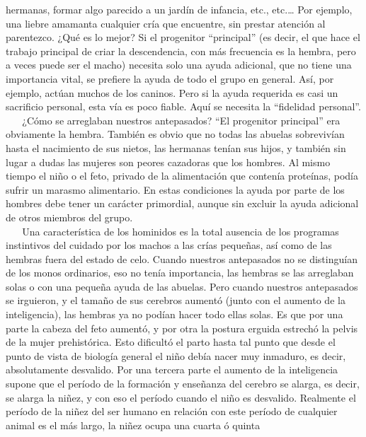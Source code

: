 hermanas, formar algo parecido a un jardín de infancia, etc.,
etc.\ldots{} Por ejemplo, una liebre amamanta cualquier cría que
encuentre, sin prestar atención al parentezco. ¿Qué es lo mejor? Si el
progenitor ``principal'' (es decir, el que hace el trabajo principal de
criar la descendencia, con más frecuencia es la hembra, pero a veces
puede ser el macho) necesita solo una ayuda adicional, que no tiene una
importancia vital, se prefiere la ayuda de todo el grupo en general.
Así, por ejemplo, actúan muchos de los caninos. Pero si la ayuda
requerida es casi un sacrificio personal, esta vía es poco fiable. Aquí
se necesita la ``fidelidad personal''.\\
\hspace*{0.333em} ~ ~ ¿Cómo se arreglaban nuestros antepasados? ``El
progenitor principal'' era obviamente la hembra. También es obvio que no
todas las abuelas sobrevivían hasta el nacimiento de sus nietos, las
hermanas tenían sus hijos, y también sin lugar a dudas las mujeres son
peores cazadoras que los hombres. Al mismo tiempo el niño o el feto,
privado de la alimentación que contenía proteínas, podía sufrir un
marasmo alimentario. En estas condiciones la ayuda por parte de los
hombres debe tener un carácter primordial, aunque sin excluir la ayuda
adicional de otros miembros del grupo.\\
\hspace*{0.333em} ~ ~ Una característica de los hominidos es la total
ausencia de los programas instintivos del cuidado por los machos a las
crías pequeñas, así como de las hembras fuera del estado de celo. Cuando
nuestros antepasados no se distinguían de los monos ordinarios, eso no
tenía importancia, las hembras se las arreglaban solas o con una pequeña
ayuda de las abuelas. Pero cuando nuestros antepasados se irguieron, y
el tamaño de sus cerebros aumentó (junto con el aumento de la
inteligencia), las hembras ya no podían hacer todo ellas solas. Es que
por una parte la cabeza del feto aumentó, y por otra la postura erguida
estrechó la pelvis de la mujer prehistórica. Esto dificultó el parto
hasta tal punto que desde el punto de vista de biología general el niño
debía nacer muy inmaduro, es decir, absolutamente desvalido. Por una
tercera parte el aumento de la inteligencia supone que el período de la
formación y enseñanza del cerebro se alarga, es decir, se alarga la
niñez, y con eso el período cuando el niño es desvalido. Realmente el
período de la niñez del ser humano en relación con este período de
cualquier animal es el más largo, la niñez ocupa una cuarta ó quinta
